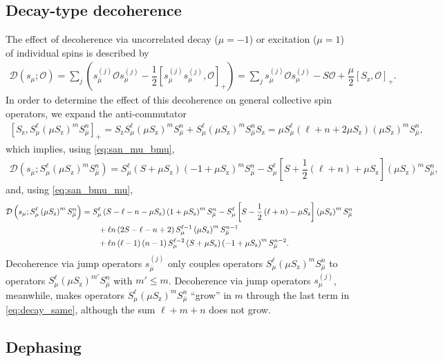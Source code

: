 \documentclass[pra,reprint,longbibliography]{revtex4-1}
\newcommand{\f}[2]{\dfrac{#1}{#2}} %
\newcommand{\p}[1]{\left(#1\right)} %
\renewcommand{\sp}[1]{\left[#1\right]} %
\newcommand{\D}{\mathcal{D}}
\renewcommand{\O}{\mathcal{O}}
\newcommand{\z}{\text{z}}
\newcommand{\bmu}{{\bar\mu}}
\newcommand{\1}{\mathds{1}}
\begin{document}
\subsection{Decay-type decoherence}
\label{sec:decay_single}

The effect of decoherence via uncorrelated decay ($\mu=-1$) or
excitation ($\mu=1$) of individual spins is described by
\begin{align}
  \D\p{s_\mu; \O}
  = \sum_j\p{s_\bmu^{(j)} \O s_\mu^{(j)}
    - \f12\sp{s_\bmu^{(j)} s_\mu^{(j)},\O}_+}
  = \sum_j s_\bmu^{(j)} \O s_\mu^{(j)}
  - S \O + \f{\mu}{2} \sp{S_\z, \O}_+.
\end{align}
In order to determine the effect of this decoherence on general
collective spin operators, we expand the anti-commutator
\begin{align}
  \sp{S_\z, S_\mu^\ell \p{\mu S_\z}^m S_\bmu^n}_+
  = S_\z S_\mu^\ell \p{\mu S_\z}^m S_\bmu^n
  + S_\mu^\ell \p{\mu S_\z}^m S_\bmu^n S_\z
  = \mu S_\mu^\ell\p{\ell+n+2\mu S_\z} \p{\mu S_\z}^m S_\bmu^n,
\end{align}
which implies, using \eqref{eq:san_mu_bmu},
\begin{align}
  \D\p{s_\bmu; S_\mu^\ell \p{\mu S_\z}^m S_\bmu^n}
  = S_\mu^\ell \p{S+\mu S_\z}\p{-1+\mu S_\z}^m S_\bmu^n
  - S_\mu^\ell\sp{S + \f12\p{\ell+n} + \mu S_\z}
  \p{\mu S_\z}^m S_\bmu^n,
  \label{eq:decay_diff}
\end{align}
and, using \eqref{eq:san_bmu_mu},
\begin{align}
  \D\p{s_\mu; S_\mu^\ell \p{\mu S_\z}^m S_\bmu^n}
  &= S_\mu^\ell \p{S - \ell - n - \mu S_\z} \p{1+\mu S_\z}^m S_\bmu^n
  - S_\mu^\ell\sp{S - \f12\p{\ell+n} - \mu S_\z}
  \p{\mu S_\z}^m S_\bmu^n \notag \\
  &\qquad + \ell n \p{2S - \ell - n + 2}
  S_\mu^{\ell-1} \p{\mu S_\z}^m S_\bmu^{n-1} \notag \\
  &\qquad + \ell n \p{\ell-1} \p{n-1} S_\mu^{\ell-2} \p{S + \mu S_\z}
  \p{-1+\mu S_\z}^m S_\bmu^{n-2}.
  \label{eq:decay_same}
\end{align}
Decoherence via jump operators $s_\bmu^{(j)}$ only couples operators
$S_\mu^\ell \p{\mu S_\z}^m S_\bmu^n$ to operators
$S_\mu^\ell \p{\mu S_\z}^{m'} S_\bmu^n$ with $m'\le m$.  Decoherence
via jump operators $s_\mu^{(j)}$, meanwhile, makes operators
$S_\mu^\ell \p{\mu S_\z}^m S_\bmu^n$ ``grow'' in $m$ through the last
term in \eqref{eq:decay_same}, although the sum $\ell+m+n$ does not
grow.


\subsection{Dephasing}
\label{sec:dephasing_single}
\end{document}
